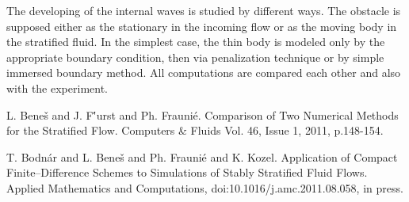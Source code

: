 The developing of the internal waves is studied by different ways. The
obstacle is supposed either as the stationary in the incoming flow or as the
moving body in the stratified fluid.
 In the simplest case, the thin body is modeled only by the appropriate boundary
 condition, then via penalization technique or by simple immersed boundary
 method.  All computations are compared  each other and also with the experiment. 


\begin{thebibliography}{10}

{\sc  L. Bene\v{s} and J. F\''{u}rst and Ph. Frauni\'{e}}. {Comparison of Two  Numerical Methods for the Stratified Flow}. Computers \& Fluids Vol. 46, Issue 1,  2011, p.148-154.



{\sc T. Bodn\'{a}r and L. Bene\v{s} and Ph. Frauni\'{e} and K. Kozel}. {Application of   Compact Finite--Difference Schemes to Simulations of Stably Stratified Fluid Flows}. Applied Mathematics and Computations, doi:10.1016/j.amc.2011.08.058, in press.

\end{thebibliography}

